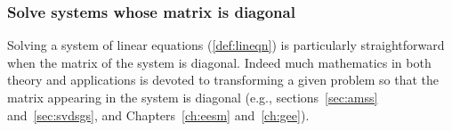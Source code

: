 \subsubsection{Solve systems whose matrix is diagonal}

Solving a system of linear equations (\autoref{def:lineqn}) is particularly straightforward when the matrix of the system is diagonal.
Indeed much mathematics in both theory and applications is devoted to transforming a given problem so that the matrix appearing in the  system is diagonal (e.g., sections~\ref{sec:amss} and~\ref{sec:svdsgs}, and Chapters~\ref{ch:eesm} and~\ref{ch:gee}).

\begin{comment}
Here prepare for using the \svd, but also use diagonal matrices to reinforce the translation to/from matrix and symbolic forms, and to reinforce zero, one, many solutions.
\end{comment}%


